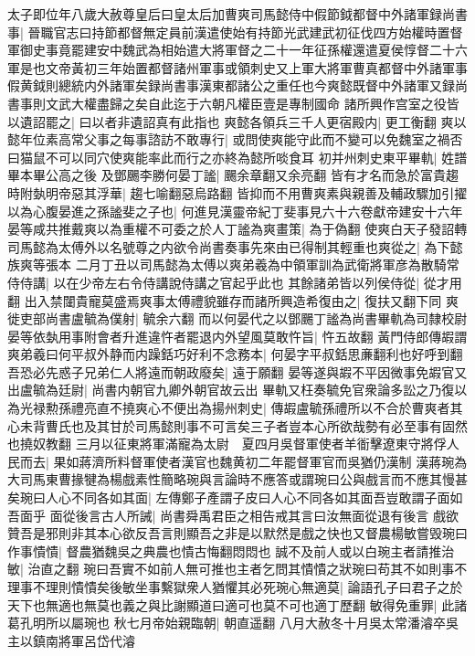 太子即位年八歲大赦尊皇后曰皇太后加曹爽司馬懿侍中假節鉞都督中外諸軍録尚書事|{
	晉職官志曰持節都督無定員前漢遣使始有持節光武建武初征伐四方始權時置督軍御史事竟罷建安中魏武為相始遣大將軍督之二十一年征孫權還遣夏侯惇督二十六軍是也文帝黃初三年始置都督諸州軍事或領刺史又上軍大將軍曹真都督中外諸軍事假黄鉞則總統内外諸軍矣録尚書事漢東都諸公之重任也今爽懿既督中外諸軍又録尚書事則文武大權盡歸之矣自此迄于六朝凡權臣壹是專制國命}
諸所興作宫室之役皆以遺詔罷之|{
	曰以者非遺詔真有此指也}
爽懿各領兵三千人更宿殿内|{
	更工衡翻}
爽以懿年位素高常父事之每事諮訪不敢專行|{
	或問使爽能守此而不變可以免魏室之禍否曰猫鼠不可以同穴使爽能率此而行之亦終為懿所啖食耳}
初并州刺史東平畢軌|{
	姓譜畢本畢公高之後}
及鄧颺李勝何晏丁謐|{
	颺余章翻又余亮翻}
皆有才名而急於富貴趨時附埶明帝惡其浮華|{
	趨七喻翻惡烏路翻}
皆抑而不用曹爽素與親善及輔政驟加引擢以為心腹晏進之孫謐斐之子也|{
	何進見漢靈帝紀丁斐事見六十六卷獻帝建安十六年}
晏等咸共推戴爽以為重權不可委之於人丁謐為爽畫策|{
	為于偽翻}
使爽白天子發詔轉司馬懿為太傅外以名號尊之内欲令尚書奏事先來由已得制其輕重也爽從之|{
	為下懿族爽等張本}
二月丁丑以司馬懿為太傅以爽弟羲為中領軍訓為武衛將軍彦為散騎常侍侍講|{
	以在少帝左右令侍講說侍講之官起乎此也}
其餘諸弟皆以列侯侍從|{
	從才用翻}
出入禁闥貴寵莫盛焉爽事太傅禮貌雖存而諸所興造希復由之|{
	復扶又翻下同}
爽徙吏部尚書盧毓為僕射|{
	毓余六翻}
而以何晏代之以鄧颺丁謐為尚書畢軌為司隸校尉晏等依埶用事附會者升進違忤者罷退内外望風莫敢忤旨|{
	忤五故翻}
黃門侍郎傳嘏謂爽弟羲曰何平叔外静而内躁銛巧好利不念務本|{
	何晏字平叔銛思亷翻利也好呼到翻}
吾恐必先惑子兄弟仁人將遠而朝政廢矣|{
	遠于願翻}
晏等遂與嘏不平因微事免嘏官又出盧毓為廷尉|{
	尚書内朝官九卿外朝官故云出}
畢軌又枉奏毓免官衆論多訟之乃復以為光禄勲孫禮亮直不撓爽心不便出為揚州刺史|{
	傳嘏盧毓孫禮所以不合於曹爽者其心未背曹氏也及其甘於司馬懿則事不可言矣三子者豈本心所欲哉勢有必至事有固然也撓奴教翻}
三月以征東將軍滿寵為太尉　夏四月吳督軍使者羊衜擊遼東守將俘人民而去|{
	果如蔣濟所料督軍使者漢官也魏黄初二年罷督軍官而吳猶仍漢制}
漢蔣琬為大司馬東曹掾犍為楊戲素性簡略琬與言論時不應答或謂琬曰公與戲言而不應其慢甚矣琬曰人心不同各如其面|{
	左傳鄭子產謂子皮曰人心不同各如其面吾豈敢謂子面如吾面乎}
面從後言古人所誡|{
	尚書舜禹君臣之相告戒其言曰汝無面從退有後言}
戲欲贊吾是邪則非其本心欲反吾言則顯吾之非是以默然是戲之快也又督農楊敏嘗毁琬曰作事憒憒|{
	督農猶魏吳之典農也憒古悔翻悶悶也}
誠不及前人或以白琬主者請推治敏|{
	治直之翻}
琬曰吾實不如前人無可推也主者乞問其憒憒之狀琬曰苟其不如則事不理事不理則憒憒矣後敏坐事繫獄衆人猶懼其必死琬心無適莫|{
	論語孔子曰君子之於天下也無適也無莫也義之與比謝顯道曰適可也莫不可也適丁歷翻}
敏得免重罪|{
	此諸葛孔明所以屬琬也}
秋七月帝始親臨朝|{
	朝直遥翻}
八月大赦冬十月吳太常潘濬卒吳主以鎮南將軍呂岱代濬

